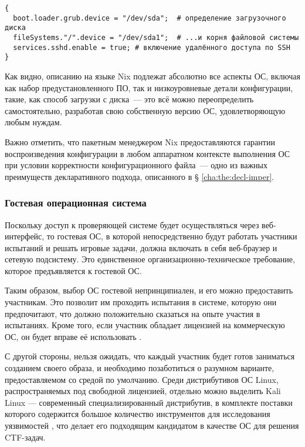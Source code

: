 \begin{lstlisting}[caption={Минимальный пример конфигурации NixOS на языке Nix}]
{
  boot.loader.grub.device = "/dev/sda";  # определение загрузочного диска
  fileSystems."/".device = "/dev/sda1";  # ...и корня файловой системы
  services.sshd.enable = true; # включение удалённого доступа по SSH
}
\end{lstlisting}

Как видно, описанию на языке Nix подлежат абсолютно все аспекты ОС, включая как набор предустановленного ПО, так и низкоуровневые детали конфигурации, такие, как способ загрузки с диска~--- это всё можно переопределить самостоятельно, разработав свою собственную версию ОС, удовлетворяющую любым нуждам.

Важно отметить, что пакетным менеджером Nix предоставляются гарантии воспроизведения конфигурации в любом аппаратном контексте выполнения ОС при условии корректности конфигурационного файла~--- одно из важных преимуществ декларативного подхода, описанного в § \ref{cha:the:decl-imper}.

\subsubsection{Гостевая операционная система}

Поскольку доступ к проверяющей системе будет осуществляться через веб-интерфейс, то гостевая ОС, в которой непосредственно будут работать участники испытаний и решать игровые задачи, должна включать в себя веб-браузер и сетевую подсистему. Это единственное организационно-техническое требование, которое предъявляется к гостевой ОС.

Таким образом, выбор ОС гостевой непринципиален, и его можно предоставить участникам. Это позволит им проходить испытания в системе, которую они предпочитают, что должно положительно сказаться на опыте участия в испытаниях. Кроме того, если участник обладает лицензией на коммерческую ОС, он будет вправе её использовать \cite{GK1261}.

С другой стороны, нельзя ожидать, что каждый участник будет готов заниматься созданием своего образа, и необходимо позаботиться о разумном варианте, предоставляемом со средой по умолчанию. Среди дистрибутивов ОС Linux, распространяемых под свободной лицензией, отдельно можно выделить Kali Linux — современный специализированный дистрибутив, в комплекте поставки которого содержится большое количество инструментов для исследования уязвимостей \cite{KaliLinux}, что делает его подходящим кандидатом в качестве ОС для решения CTF-задач.


